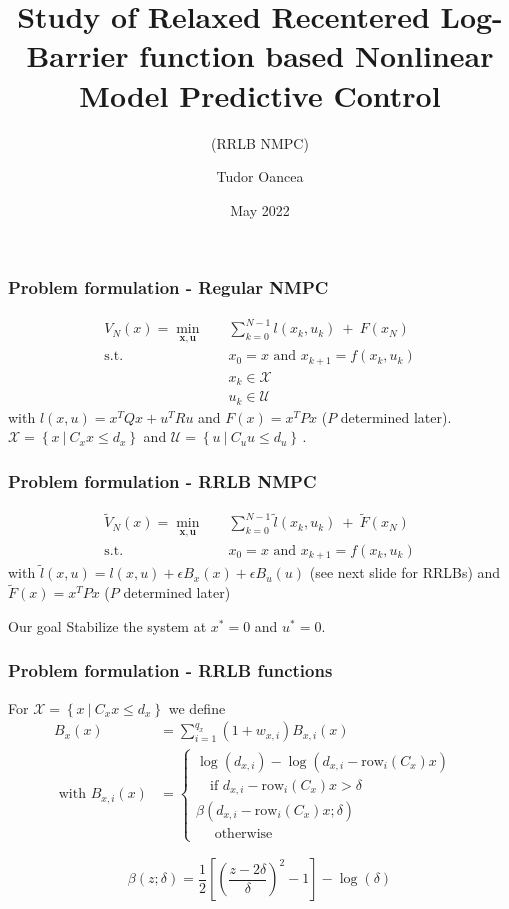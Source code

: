 \documentclass[10pt]{beamer}
\title[RRLB NMPC]{Study of Relaxed Recentered Log-Barrier function based Nonlinear Model Predictive Control}
\subtitle{(RRLB NMPC)}
\author{Tudor Oancea}
\date{May 2022}
\def\cal#1{\mathcal{#1}}
\begin{document}
\frame{\titlepage}

\begin{frame}
    \frametitle{Problem formulation - Regular NMPC}
    \begin{align*}
        V_N(x)=\underset{\mathbf{x},\mathbf{u}}{\min} &\quad \sum_{k=0}^{N-1}l(x_k,u_k)~+~F(x_N)\\
        \text{s.t.} &\quad x_0=x\text{ and }x_{k+1}=f(x_k,u_k)\\
        &\quad x_k\in\cal{X}\\
        &\quad u_k\in\cal{U}
    \end{align*}
    with $l(x,u)=x^TQx+u^TRu$ and $F(x)=x^TPx$ ($P$ determined later).
     $\mathcal{X}=\left\{x~|~C_xx\leq d_x \right\}$ and $\mathcal{U}=\left\{u~|~C_uu\leq d_u \right\}$\,.
\end{frame}

\begin{frame}
    \frametitle{Problem formulation - RRLB NMPC}
    \begin{align*}
        \tilde{V}_N(x)=\underset{\mathbf{x},\mathbf{u}}{\min} &\quad \sum_{k=0}^{N-1}\tilde{l}(x_k,u_k)~+~\tilde{F}(x_N)\\
        \text{s.t.} &\quad x_0=x\text{ and }x_{k+1}=f(x_k,u_k)
    \end{align*}
    with $\tilde{l}(x,u)=l(x,u) + \epsilon B_x(x)+\epsilon B_u(u)$ (see next slide for RRLBs) and $\tilde{F}(x)=x^TPx$ ($P$ determined later)
    \begin{alertblock}{Our goal}
        Stabilize the system at $x^*=0$ and $u^*=0$.
    \end{alertblock}
\end{frame}

\begin{frame}
    \frametitle{Problem formulation - RRLB functions}

    For $\cal{X}=\left\{ x~|~C_xx\leq d_x \right\}$ we define
    \begin{align*}
        B_x(x)&=\sum_{i=1}^{q_x}(1+w_{x,i})B_{x,i}(x)\\
        \text{ with }B_{x,i}(x)&=\begin{cases}
            \log(d_{x,i})-\log(d_{x,i}-\mathrm{row}_i(C_x)x)&\\
            \quad\text{if }d_{x,i}-\mathrm{row}_i(C_x)x>\delta\\
            \beta(d_{x,i}-\mathrm{row}_i(C_x)x;\delta)&\\
            \quad\text{ otherwise}
        \end{cases}
    \end{align*}

    $$\beta(z;\delta)=\frac{1}{2}\left[ \left( \frac{z-2\delta}{\delta} \right)^2-1 \right]-\log(\delta)$$
\end{frame}
\end{document}
